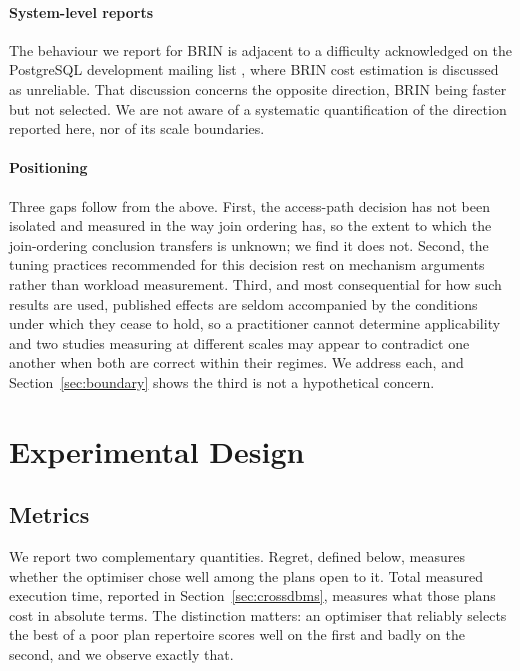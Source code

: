 \documentclass[preprint,12pt,authoryear]{elsarticle}
\begin{document}
\paragraph{System-level reports}
The behaviour we report for BRIN is adjacent to a difficulty
acknowledged on the PostgreSQL development mailing list
\citep{pghackers2019brin}, where BRIN cost estimation is discussed as
unreliable. That discussion concerns the opposite direction, BRIN being
faster but not selected. We are not aware of a systematic
quantification of the direction reported here, nor of its scale
boundaries.

\paragraph{Positioning}
Three gaps follow from the above. First, the access-path decision has
not been isolated and measured in the way join ordering has, so the
extent to which the join-ordering conclusion transfers is unknown; we
find it does not. Second, the tuning practices recommended for this
decision rest on mechanism arguments rather than workload measurement.
Third, and most consequential for how such results are used, published
effects are seldom accompanied by the conditions under which they
cease to hold, so a practitioner cannot determine applicability and two
studies measuring at different scales may appear to contradict one
another when both are correct within their regimes. We address each,
and Section~\ref{sec:boundary} shows the third is not a hypothetical
concern.

\section{Experimental Design}
\label{sec:design}

\subsection{Metrics}
\label{sec:metrics}

We report two complementary quantities. Regret, defined below, measures
whether the optimiser chose well among the plans open to it. Total
measured execution time, reported in Section~\ref{sec:crossdbms},
measures what those plans cost in absolute terms. The distinction
matters: an optimiser that reliably selects the best of a poor plan
repertoire scores well on the first and badly on the second, and we
observe exactly that.
\end{document}
